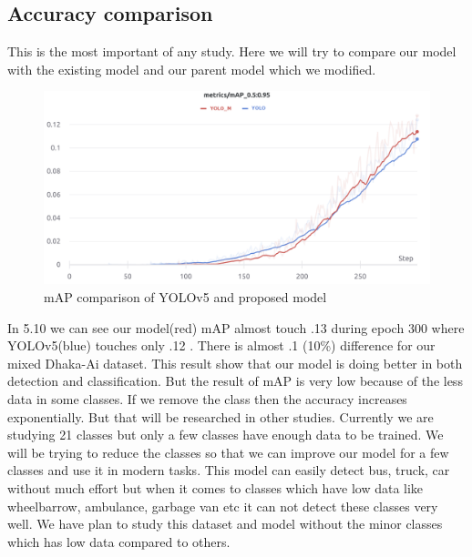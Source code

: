 \subsection{Accuracy comparison  }
This is the most important of any study. Here we will try to compare our model with the existing model and our parent model which we modified. 

\begin{figure}[h]
    \centering
    \includegraphics[max width=\textwidth]{images/ours/mAP.png}
   \caption[mAP comparison of YOLOv5 and proposed model]{mAP comparison of YOLOv5 and proposed model}
    \label{fig:ma}
\end{figure}

In 5.10 we can see our model(red) mAP almost touch .13 during epoch 300 where YOLOv5(blue) touches only .12 . There is almost .1 (10\%) difference for our mixed Dhaka-Ai dataset. This result show that our model is doing better in both detection and classification. But the result of mAP is very low because of the less data in some classes. If we remove the class then the accuracy increases exponentially. But that will be researched in other studies. Currently we are studying 21 classes but only a few classes have enough data to be trained. We will be trying to reduce the classes so that we can improve our model for a few classes and use it in modern tasks. This model can easily detect bus, truck, car  without much effort but when it comes to classes which have low data like wheelbarrow, ambulance, garbage van etc it can not detect these classes very well. We have plan to study this dataset and model without the minor classes which has low data compared to others.

